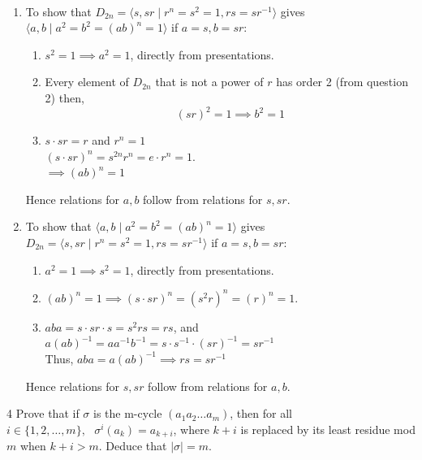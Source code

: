\documentclass[12pt]{article}
\begin{document}
\begin{solution}
    \bbni \\
    \begin{enumerate}
        \item To show that $D_{2n} = \langle s, sr \mid r^n = s^2 = 1, rs = sr^{-1}\rangle$ gives $\langle a, b \mid a^2 = b^2 = (ab)^n = 1 \rangle$ if $a = s, b = sr$: 
            \begin{enumerate}
                \item $s^2 = 1 \implies a^2 = 1$, directly from presentations. 
                \item Every element of $D_{2n}$ that is not a power of $r$ has order 2 (from question 2) then, \\
                \[(sr)^2 = 1 \implies b^2 = 1\] 
                \item $s \cdot sr = r$ and $r^n = 1$ \\ 
                $(s\cdot sr)^n = s^{2n}r^n =e\cdot r^n = 1$. \\ 
                $\implies (ab)^n = 1$
            \end{enumerate}
            Hence relations for $a, b$ follow from relations for $s,sr$. 

        \bbni 
        
        \item To show that $\langle a, b \mid a^2 = b^2 = (ab)^n = 1 \rangle$ gives $D_{2n} = \langle s, sr \mid r^n = s^2 = 1, rs = sr^{-1}\rangle$ if $a = s, b = sr$: 
        \begin{enumerate}
            \item $a^2 = 1 \implies s^2 = 1$, directly from presentations. 
            \item $(ab)^n = 1 \implies (s\cdot sr)^n = (s^2r)^n = (r)^n  = 1$.
            \item $aba = s \cdot sr \cdot s = s^2 rs = rs$, and \\
            $a(ab)^{-1} = aa^{-1}b^{-1} = s \cdot s^{-1}\cdot (sr)^{-1} = sr^{-1}$ \\
            Thus, 
            $aba = a(ab)^{-1} \implies rs = sr^{-1}$
        \end{enumerate}
        Hence relations for $s, sr$ follow from relations for $a, b$. 
    \end{enumerate}
\end{solution}

\newpage
\begin{problem}{4}
    Prove that if $\sigma$ is the m-cycle $(a_1a_2\ldots a_m)$, then for all \\ $i \in \{1, 2, \ldots, m\},  \text{ } \sigma^i (a_k) = a_{k+i}$, where $k + i$ is replaced by its least residue mod $m$ when $k+i > m$. Deduce that $\mid \sigma \mid = m$.     
\end{problem}
\end{document}
